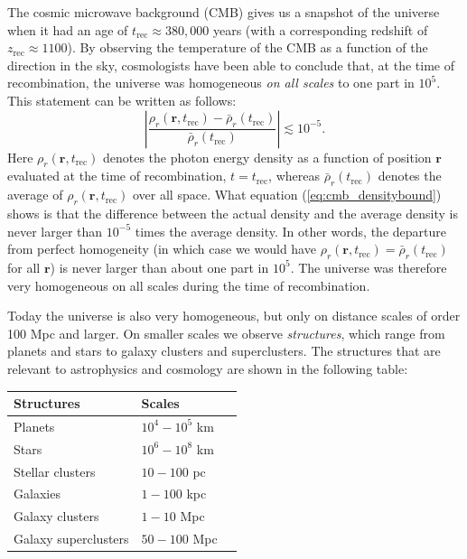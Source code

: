 \documentclass[11pt, a4paper,oneside,openright]{book}
\numberwithin{equation}{section}
\begin{document}
The cosmic microwave background (CMB) gives us a snapshot of the universe when it had an age of $t_{\mathrm{rec}}\approx 380,000$ years (with a corresponding redshift of $z_{\mathrm{rec}}\approx1100$). By observing the temperature of the CMB as a function of the direction in the sky, cosmologists have been able to conclude that, at the time of recombination, the universe was homogeneous {\it on all scales} to one part in $10^5$. This statement can be written as follows:
\begin{equation} \label{eq:cmb_densitybound}
\left| \frac{\rho_r(\mathbf{r},t_{\mathrm{rec}})-\bar{\rho}_r(t_{\mathrm{rec}})}{\bar{\rho}_r(t_{\mathrm{rec}})} \right| \lesssim 10^{-5}.
\end{equation}
Here $\rho_r(\mathbf{r},t_{\mathrm{rec}})$ denotes the photon energy density as a function of position $\mathbf{r}$ evaluated at the time of recombination, $t=t_{\mathrm{rec}}$, whereas $\bar{\rho}_r(t_{\mathrm{rec}})$ denotes the average of $\rho_r(\mathbf{r},t_{\mathrm{rec}})$ over all space. What equation (\ref{eq:cmb_densitybound}) shows is that the difference between the actual density and the average density is never larger than $10^{-5}$ times the average density. In other words, the departure from perfect homogeneity (in which case we would have $\rho_r(\mathbf{r},t_{\mathrm{rec}})=\bar{\rho}_r(t_{\mathrm{rec}})$ for all $\mathbf{r}$) is never larger than about one part in $10^5$. The universe was therefore very homogeneous on all scales during the time of recombination.

Today the universe is also very homogeneous, but only on distance scales of order 100 Mpc and larger. On smaller scales we observe {\it structures}, which range from planets and stars to galaxy clusters and superclusters. The structures that are relevant to astrophysics and cosmology are shown in the following table:
\begin{table}[ht]
\begin{center}
\begin{tabular}{p{5cm} l l} \hline\hline
Structures & Scales  \\ \hline
Planets & $10^4-10^5$ km \\
Stars & $10^6-10^8$ km \\
Stellar clusters & $10-100$ pc \\
Galaxies & $1-100$ kpc \\
Galaxy clusters & $1-10$ Mpc \\
Galaxy superclusters & $50-100$ Mpc \\ \hline\hline
\end{tabular}
\end{center}
\end{table}
\end{document}
